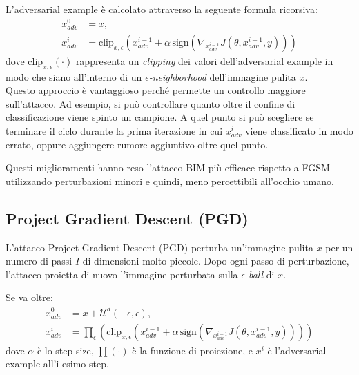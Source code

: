     L’adversarial example è calcolato attraverso la seguente formula ricorsiva:
        \begin{equation}
            \begin{split}
                x_{adv}^0 &= x,\\
                x_{adv}^i &= \text{clip}_{x, \epsilon}(x_{adv}^{i-1}+ \alpha\, \text{sign} (\nabla_{x_{adv}^{i-1}} J(\theta, x_{adv}^{i-1}, y)))
            \end{split}    
        \end{equation}
    dove $\text{clip}_{x, \epsilon}(\cdot)$ rappresenta un \textit{clipping} dei valori dell'adversarial example in modo che siano all'interno di un\textit{ $\epsilon$-neighborhood} dell'immagine pulita $x$.\\
    
    Questo approccio è vantaggioso perché permette un controllo maggiore sull'attacco. Ad esempio, si può controllare quanto oltre il confine di classificazione viene spinto un campione. A quel punto si può scegliere se terminare il ciclo durante la prima iterazione in cui $x_{adv}^i$ viene classificato in modo errato, oppure aggiungere rumore aggiuntivo oltre quel punto.
    
    Questi miglioramenti hanno reso l'attacco BIM più efficace rispetto a FGSM utilizzando perturbazioni minori e quindi, meno percettibili all'occhio umano.
    
    \subsection{Project Gradient Descent (PGD)}
    \label{PGD}
    L'attacco Project Gradient Descent (PGD) \cite{madry2017towards} perturba un'immagine pulita $x$ per un numero di passi $I$ di dimensioni molto piccole. Dopo ogni passo di perturbazione, l'attacco proietta di nuovo l'immagine perturbata sulla \textit{$\epsilon$-ball} di $x$.
    
    Se va oltre:
        \begin{equation}
            \begin{split}
                x_{adv}^0 &= x + \mathcal{U}^d(-\epsilon,\epsilon),\\
                x_{adv}^i &= \prod_{\epsilon}(\text{clip}_{x, \epsilon}(x_{adv}^{i-1}+ \alpha\, \text{sign} (\nabla_{x_{adv}^{i-1}} J(\theta, x_{adv}^{i-1}, y))))
            \end{split} 
        \end{equation}
    dove $\alpha$ è lo step-size, $\prod(\cdot)$ è la funzione di proiezione, e $x^i$ è l'adversarial example all'i-esimo step.
    
